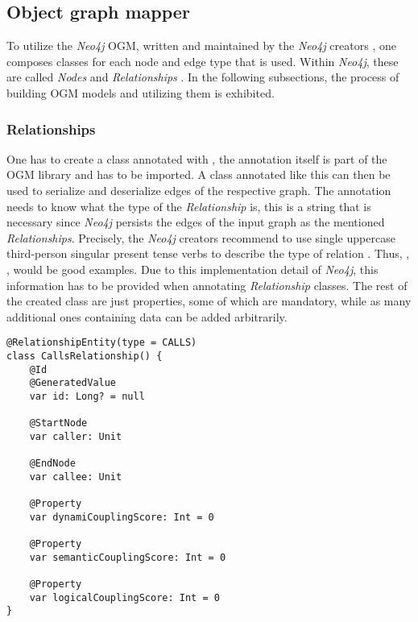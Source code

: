 \documentclass[12pt,a4paper]{report}
\begin{document}
\subsection{Object graph mapper}

To utilize the \textit{Neo4j} OGM, written and maintained by the \textit{Neo4j}
creators \cite{neo4j-ogm}, one composes classes for each node and edge type
that is used. Within \textit{Neo4j}, these are called \textit{Nodes} and
\textit{Relationships} \cite{neo4j-ogm}.
In the following subsections, the process of building OGM models and utilizing
them is exhibited.


\subsubsection{Relationships}
One has to create a class annotated with ,
the annotation itself is part of the OGM library and has to be imported.
A class annotated like this can then be used to serialize and deserialize edges
of the respective graph. The annotation needs to know what the type of the
\textit{Relationship} is, this is a string that is necessary since \textit{Neo4j}
persists the edges of the input graph as the mentioned \textit{Relationships}.
Precisely, the \textit{Neo4j} creators recommend to use single uppercase third-person
singular present tense verbs to describe the type of relation \cite{neo4j-ogm}.
Thus, , ,  would
be good examples. Due to this implementation detail of \textit{Neo4j},
this information has to be provided when annotating \textit{Relationship} classes.
The rest of the created class are just properties, some of which are mandatory,
while as many additional ones containing data can be added arbitrarily.

\smaller
\begin{lstlisting}[caption=Relationship OGM class, label=ogm-relationship, breaklines=true]
@RelationshipEntity(type = CALLS)
class CallsRelationship() {
    @Id
    @GeneratedValue
    var id: Long? = null

    @StartNode
    var caller: Unit

    @EndNode
    var callee: Unit

    @Property
    var dynamiCouplingScore: Int = 0

    @Property
    var semanticCouplingScore: Int = 0

    @Property
    var logicalCouplingScore: Int = 0
}
\end{lstlisting}
\normalsize
\end{document}

